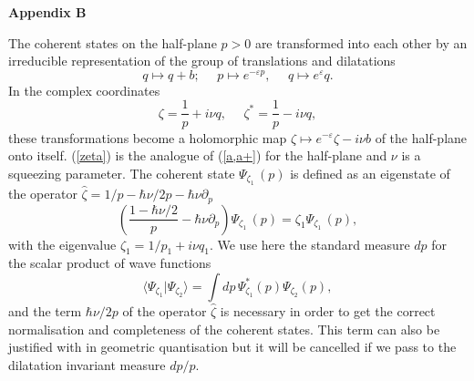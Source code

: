 \documentclass[a4paper,12pt]{article}
\def\theequation{\arabic{section}.\arabic{equation}}
\begin{document}
\vspace{1cm}

\setcounter{equation}{0}
\def\theequation{B.\arabic{equation}}

{\bf {\Large Appendix B}}

\vspace{0.5cm}

\noindent
The coherent states on the half-plane $p>0$ are transformed into each other
by an irreducible representation of the group of translations and dilatations
\begin{equation}\label{T+D}
 q\mapsto q+b;~~~~~~p\mapsto  e^{-\varepsilon p},~~~~~~q\mapsto
e^{\varepsilon}q.
\end{equation}
In the complex coordinates
\begin{equation}\label{zeta}
\zeta=\frac{1}{p}+i\nu q,~~~~~~\zeta^*=\frac{1}{p}-i\nu q,
\end{equation}
these transformations become a  holomorphic map
$\zeta\mapsto  e^{-\varepsilon} \zeta-i\nu b$
of the half-plane onto itself.
(\ref{zeta}) is the analogue of (\ref{a,a+})
for the half-plane and $\nu$ is a squeezing parameter.
The coherent state $\Psi_{\zeta_1}\,(p)$ is defined as an eigenstate
of the operator
$\hat \zeta=1/p-\hbar\nu/2p-\hbar\nu\partial_p$
\begin{equation}\label{eigenv-z}
\left( \frac{1-\hbar\nu/2}{p}-\hbar\nu\partial_p\right)\Psi_{\zeta_1}\,(p)=
\zeta_1\Psi_{\zeta_1}\,(p),
\end{equation}
with the  eigenvalue $\zeta_1=1/p_1+i\nu q_1$.
We use here the standard measure $dp$ for the scalar product of
wave functions
\begin{equation}\label{scalar-pr}
\langle \Psi_{\zeta_1}|\Psi_{\zeta_2} \rangle=\int dp\,\Psi_{\zeta_1}^*(p)
\Psi_{\zeta_2}(p),
\end{equation}
and the term $\hbar\nu/2p$ of the operator
$\hat \zeta$ is necessary in order to
get the correct normalisation and completeness of the coherent states.
This term can also be justified with in
geometric quantisation \cite{Woodhouse} but
it will be cancelled if we pass to the dilatation invariant measure
$dp/p$.
\end{document}
